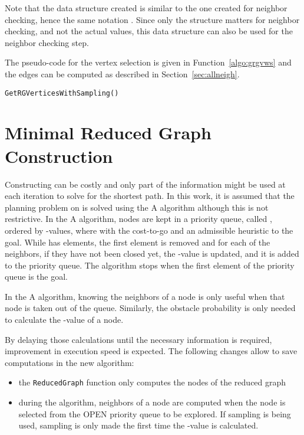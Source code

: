 \documentclass[letterpaper, 10 pt, conference]{ieeeconf}
\makeatletter
\theoremstyle{definition}
\newcounter{megaalgorithm}
\newenvironment{megaalgorithm}[1][htb]
  {\renewcommand{\algorithmcfname}{Function}\let\c@algocf\c@megaalgorithm \begin{algorithm}[#1]}{\end{algorithm}}
\makeatother
\begin{document}
Note that the data structure created is similar to the one created for neighbor checking, hence the same notation .
Since only the structure matters for neighbor checking, and not the actual values, this data structure can also be used for the neighbor checking step.

The pseudo-code for the vertex selection is given in Function~\ref{algo:grgvws} and the edges can be computed as described in Section~\ref{sec:allneigh}.

\begin{megaalgorithm}[ht]

 \caption{\tt GetRGVerticesWithSampling()}
\label{algo:grgvws}
\end{megaalgorithm}

\section{Minimal Reduced Graph Construction}

Constructing  can be costly and only part of the information might be used at each iteration to solve for the shortest path.
In this work, it is assumed that the planning problem on  is solved using the A algorithm although this is not restrictive.
In the A algorithm, nodes are kept in a priority queue, called , ordered by -values, where  with  the cost-to-go and  an admissible heuristic to the goal. While  has elements, the first element is removed and for each of the neighbors, if they have not been closed yet, the -value is updated, and it is added to the  priority queue. The algorithm stops when the first element of the  priority queue is the goal.

In the A algorithm, knowing the neighbors of a node is only useful when that node is taken out of the  queue.
Similarly, the obstacle probability is only needed to calculate the {-value} of a node.

By delaying those calculations until the necessary information is required, improvement in execution speed is expected. The following changes allow to save computations in the new algorithm:

\begin{itemize}
\item the {\tt ReducedGraph} function only computes the nodes of the reduced graph
\item during the  algorithm, neighbors of a node are computed when the node is selected from the OPEN priority queue to be explored. If sampling is being used, sampling is only made the first time the -value is calculated.
\end{itemize}
\end{document}
